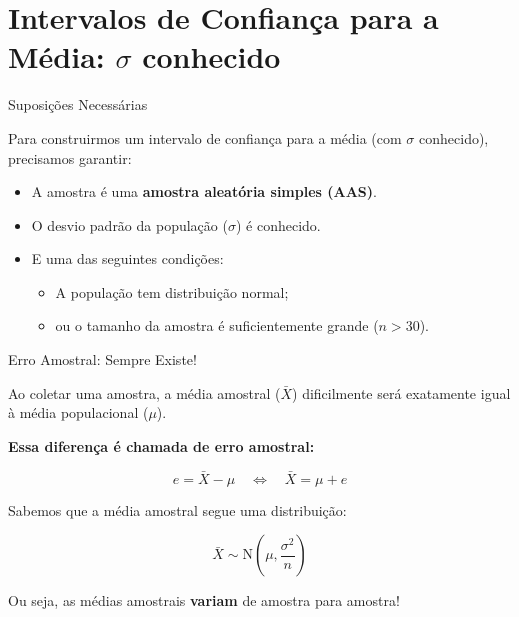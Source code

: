 \documentclass[14pt,aspectratio=1610]{beamer}
\begin{document}
	
\section{Intervalos de Confiança para a Média: $\sigma$ conhecido}

\begin{frame}{Suposições Necessárias}
	\begin{block}{}
		\justifying
		Para construirmos um intervalo de confiança para a média (com $\sigma$ conhecido), precisamos garantir:
		\begin{itemize}
			\item A amostra é uma \textbf{amostra aleatória simples (AAS)}.
			\item O desvio padrão da população ($\sigma$) é conhecido.
			\item E uma das seguintes condições:
			\begin{itemize}
				\item A população tem distribuição normal;
				\item ou o tamanho da amostra é suficientemente grande ($n > 30$).
			\end{itemize}
		\end{itemize}
	\end{block}
\end{frame}

\begin{frame}{Erro Amostral: Sempre Existe!}
	\small
	\begin{block}{}
		\justifying
		Ao coletar uma amostra, a média amostral ($\bar{X}$) dificilmente será exatamente igual à média populacional ($\mu$).
		
		\textbf{Essa diferença é chamada de erro amostral:}
		
		\[
		e = \bar{X} - \mu \quad \Leftrightarrow \quad \bar{X} = \mu + e
		\]
		
		Sabemos que a média amostral segue uma distribuição:
		
		\[
		\bar{X} \sim \text{N}\left(\mu, \frac{\sigma^2}{n}\right)
		\]
		
		Ou seja, as médias amostrais \textbf{variam} de amostra para amostra!
	\end{block}
\end{frame}
\end{document}
